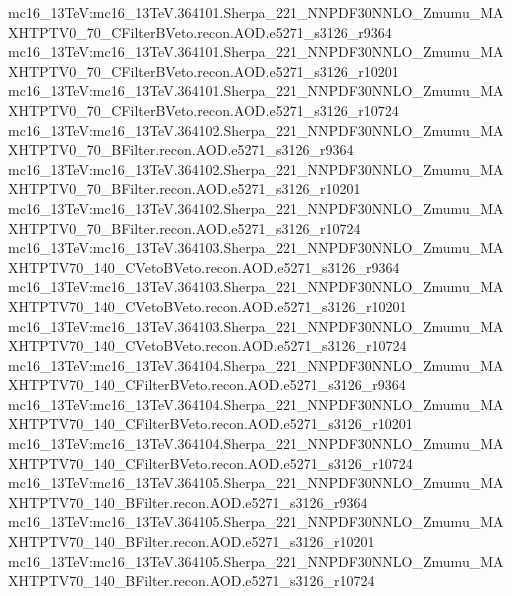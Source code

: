 { mc16\_13TeV:mc16\_13TeV.364101.Sherpa\_221\_NNPDF30NNLO\_Zmumu\_MAXHTPTV0\_70\_CFilterBVeto.recon.AOD.e5271\_s3126\_r9364  \newline   
 mc16\_13TeV:mc16\_13TeV.364101.Sherpa\_221\_NNPDF30NNLO\_Zmumu\_MAXHTPTV0\_70\_CFilterBVeto.recon.AOD.e5271\_s3126\_r10201 \newline    
 mc16\_13TeV:mc16\_13TeV.364101.Sherpa\_221\_NNPDF30NNLO\_Zmumu\_MAXHTPTV0\_70\_CFilterBVeto.recon.AOD.e5271\_s3126\_r10724 \newline    
 mc16\_13TeV:mc16\_13TeV.364102.Sherpa\_221\_NNPDF30NNLO\_Zmumu\_MAXHTPTV0\_70\_BFilter.recon.AOD.e5271\_s3126\_r9364 \newline   
 mc16\_13TeV:mc16\_13TeV.364102.Sherpa\_221\_NNPDF30NNLO\_Zmumu\_MAXHTPTV0\_70\_BFilter.recon.AOD.e5271\_s3126\_r10201 \newline    
 mc16\_13TeV:mc16\_13TeV.364102.Sherpa\_221\_NNPDF30NNLO\_Zmumu\_MAXHTPTV0\_70\_BFilter.recon.AOD.e5271\_s3126\_r10724 \newline    
 mc16\_13TeV:mc16\_13TeV.364103.Sherpa\_221\_NNPDF30NNLO\_Zmumu\_MAXHTPTV70\_140\_CVetoBVeto.recon.AOD.e5271\_s3126\_r9364  \newline   
 mc16\_13TeV:mc16\_13TeV.364103.Sherpa\_221\_NNPDF30NNLO\_Zmumu\_MAXHTPTV70\_140\_CVetoBVeto.recon.AOD.e5271\_s3126\_r10201  \newline   
 mc16\_13TeV:mc16\_13TeV.364103.Sherpa\_221\_NNPDF30NNLO\_Zmumu\_MAXHTPTV70\_140\_CVetoBVeto.recon.AOD.e5271\_s3126\_r10724 \newline    
 mc16\_13TeV:mc16\_13TeV.364104.Sherpa\_221\_NNPDF30NNLO\_Zmumu\_MAXHTPTV70\_140\_CFilterBVeto.recon.AOD.e5271\_s3126\_r9364  \newline   
 mc16\_13TeV:mc16\_13TeV.364104.Sherpa\_221\_NNPDF30NNLO\_Zmumu\_MAXHTPTV70\_140\_CFilterBVeto.recon.AOD.e5271\_s3126\_r10201 \newline    
 mc16\_13TeV:mc16\_13TeV.364104.Sherpa\_221\_NNPDF30NNLO\_Zmumu\_MAXHTPTV70\_140\_CFilterBVeto.recon.AOD.e5271\_s3126\_r10724  \newline   
 mc16\_13TeV:mc16\_13TeV.364105.Sherpa\_221\_NNPDF30NNLO\_Zmumu\_MAXHTPTV70\_140\_BFilter.recon.AOD.e5271\_s3126\_r9364 \newline    
 mc16\_13TeV:mc16\_13TeV.364105.Sherpa\_221\_NNPDF30NNLO\_Zmumu\_MAXHTPTV70\_140\_BFilter.recon.AOD.e5271\_s3126\_r10201 \newline    
 mc16\_13TeV:mc16\_13TeV.364105.Sherpa\_221\_NNPDF30NNLO\_Zmumu\_MAXHTPTV70\_140\_BFilter.recon.AOD.e5271\_s3126\_r10724  \newline   
}

